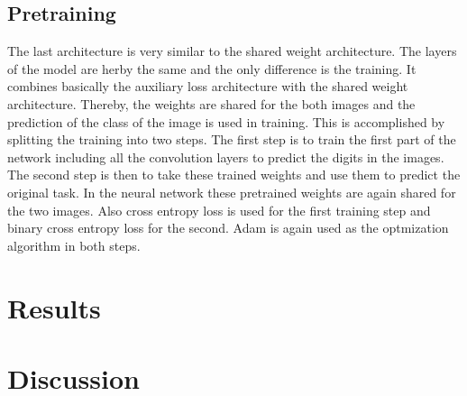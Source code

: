 \documentclass[12pt]{article}
\begin{document}
\subsection{Pretraining}
The last architecture is very similar to the shared weight architecture.
The layers of the model are herby the same and the only difference is the training.
It combines basically the auxiliary loss architecture with the shared weight architecture.
Thereby, the weights are shared for the both images and the prediction of the class of the image is used in training.
This is accomplished by splitting the training into two steps.
The first step is to train the first part of the network including all the convolution layers to predict the digits in the images.
The second step is then to take these trained weights and use them to predict the original task.
In the neural network these pretrained weights are again shared for the two images.
Also cross entropy loss is used for the first training step and binary cross entropy loss for the second.
Adam is again used as the optmization algorithm in both steps. 
\section{Results}
\section{Discussion}
\end{document}
